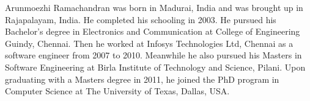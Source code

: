 Arunmoezhi Ramachandran was born in Madurai, India and was brought up in Rajapalayam, India. He completed his schooling in 2003. He pursued his Bachelor's degree in Electronics and Communication at College of Engineering Guindy, Chennai. Then he worked at Infosys Technologies Ltd, Chennai as a software engineer from 2007 to 2010. Meanwhile he also pursued his Masters in Software Engineering at Birla Institute of Technology and Science, Pilani. Upon graduating with a Masters degree in 2011, he joined the PhD program in Computer Science at The University of Texas, Dallas, USA.